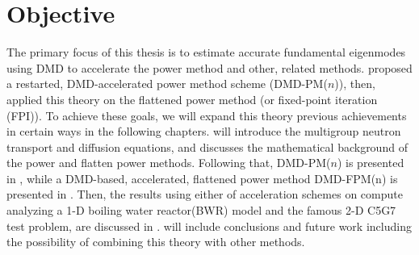 \section{Objective}
The primary focus of this thesis is to estimate accurate fundamental eigenmodes using DMD to accelerate the power method and other, related methods.
\citet{roberts2019acceleration} proposed a restarted, DMD-accelerated power method scheme (DMD-PM($n$)), then, \citet{xu_acceleration} applied this theory on the flattened power method (or fixed-point iteration (FPI)).
To achieve these goals, we will expand this theory previous achievements in certain ways in the following chapters.
 will introduce the multigroup neutron transport and diffusion equations, and  discusses the mathematical background of the power and flatten power methods.
Following that, DMD-PM($n$) is presented in , while a DMD-based, accelerated, flattened power
method DMD-FPM(n) is presented in .
Then, the results using either of acceleration schemes on compute analyzing a 1-D boiling water reactor(BWR) model and the famous 2-D C5G7 test problem, are discussed in .
 will include conclusions and future work including the possibility of combining this theory with other methods. 

